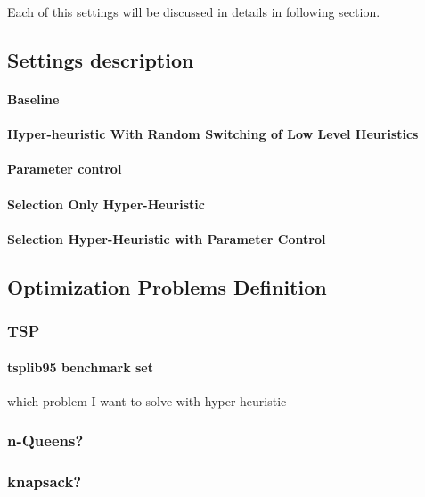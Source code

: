 Each of this settings will be discussed in details in following section.


\subsection{Settings description}
\paragraph{Baseline}

\paragraph{Hyper-heuristic With Random Switching of Low Level Heuristics}

\paragraph{Parameter control}

\paragraph{Selection Only Hyper-Heuristic}

\paragraph{Selection Hyper-Heuristic with Parameter Control}



\subsection{Optimization Problems Definition}
\subsubsection{TSP}
\paragraph{tsplib95 benchmark set}
which problem I want to solve with hyper-heuristic
\subsubsection{n-Queens?}
\subsubsection{knapsack?}



